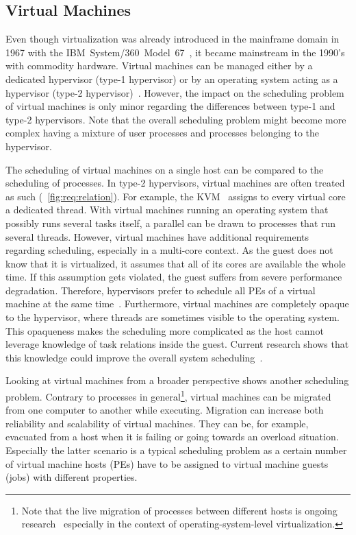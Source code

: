 \subsection{Virtual Machines}%
\label{sec:analysis:exec:vm}

Even though virtualization was already introduced in the mainframe domain in 1967 with the IBM~System/360~Model~67~\cite[57]{IBM-2010-zEnterprise}, it became mainstream in the 1990's with commodity hardware. Virtual machines can be managed either by a dedicated hypervisor (type-1 hypervisor) or by an operating system acting as a hypervisor (type-2 hypervisor)~\cite{Popek-1974-VM}. However, the impact on the scheduling problem of virtual machines is only minor regarding the differences between type-1 and type-2 hypervisors. Note that the overall scheduling problem might become more complex having a mixture of user processes and processes belonging to the hypervisor.

The scheduling of virtual machines on a single host can be compared to the scheduling of processes. In type-2 hypervisors, virtual machines are often treated as such (\cf~\cref{fig:req:relation}). For example, the \ac{KVM}~\cite{kvm} assigns to every virtual core a dedicated thread. With virtual machines running an operating system that possibly runs several tasks itself, a parallel can be drawn to processes that run several threads. However, virtual machines have additional requirements regarding scheduling, especially in a multi-core context. As the guest does not know that it is virtualized, it assumes that all of its cores are available the whole time. If this assumption gets violated, the guest suffers from severe performance degradation. Therefore, hypervisors prefer to schedule all \acp{PE} of a virtual machine at the same time~\cite{VMware-2013-vSphereScheduler,Schoenherr-2012-Cosched}. Furthermore, virtual machines are completely opaque to the hypervisor, where threads are sometimes visible to the operating system. This opaqueness makes the scheduling more complicated as the host cannot leverage knowledge of task relations inside the guest. Current research shows that this knowledge could improve the overall system scheduling~\cite{Busse-2015-PartialCoSched}.

Looking at virtual machines from a broader perspective shows another scheduling problem. Contrary to processes in general\footnote{Note that the live migration of processes between different hosts is ongoing research~\cite{criu} especially in the context of operating-system-level virtualization.}, virtual machines can be migrated from one computer to another while executing. Migration can increase both reliability and scalability of virtual machines. They can be, for example, evacuated from a host when it is failing or going towards an overload situation. Especially the latter scenario is a typical scheduling problem as a certain number of virtual machine hosts (\acp{PE}) have to be assigned to virtual machine guests (jobs) with different properties.

